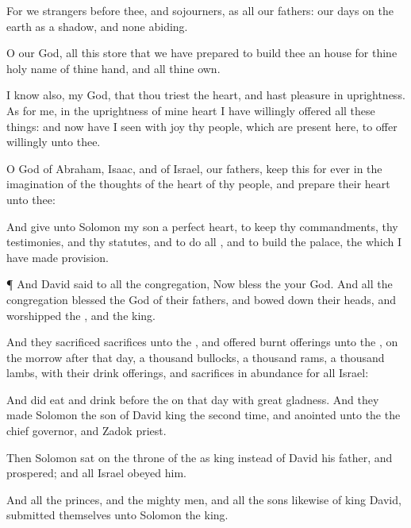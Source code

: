 {For we
{}
strangers
before thee, and
sojourners, as
{} all our
fathers: our
days on the
earth
{} as a
shadow, and
{} none
abiding.

O
{} our
God, all this
store that we have
prepared to
build thee an
house for thine
holy
name
{} of thine
hand, and
{} all thine own.

I
know also, my
God, that thou
triest the
heart, and hast
pleasure in
uprightness. As for me, in the
uprightness of mine
heart I have willingly
offered all these things: and now have I
seen with
joy thy
people, which are
present here, to offer
willingly unto thee.

O
{}
God of
Abraham,
Isaac, and of
Israel, our
fathers,
keep this for
ever in the
imagination of the
thoughts of the
heart of thy
people, and
prepare their
heart unto thee:

And
give unto
Solomon my
son a
perfect
heart, to
keep thy
commandments, thy
testimonies, and thy
statutes, and to
do all
{}, and to
build the
palace,
{} the which I have made
provision.


\par }{\PP {}¶ And
David
said to all the
congregation, Now
bless the
{} your
God. And all the
congregation
blessed the
{}
God of their
fathers, and bowed down their
heads, and
worshipped the
{}, and the
king.

And they
sacrificed
sacrifices unto the
{}, and
offered burnt
offerings unto the
{}, on the
morrow after that
day,
{} a
thousand
bullocks, a
thousand
rams,
{} a
thousand
lambs, with their drink
offerings, and
sacrifices in
abundance for all
Israel:

And did
eat and
drink
before the
{} on that
day with
great
gladness. And they made
Solomon the
son of
David
king the second
time, and
anointed
{} unto the
{}
{} the chief
governor, and
Zadok
{}
priest.


\par }{\PP {}Then
Solomon sat
on the
throne of the
{} as
king instead of
David his
father, and
prospered; and all
Israel
obeyed him.

And all the
princes, and the mighty
men, and all the
sons likewise of
king
David, submitted
themselves unto
Solomon the
king.

}
